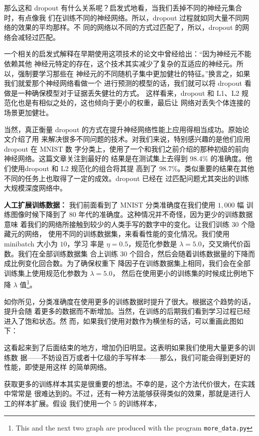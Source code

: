 那么这和 dropout 有什么关系呢？启发式地看，当我们丢掉不同的神经元集合时，有点像我
们在训练不同的神经网络。所以，dropout 过程就如同大量不同网络的效果的平均那样。不
同的网络以不同的方式过匹配了，所以，dropout 的网络会减轻过匹配。

一个相关的启发式解释在早期使用这项技术的论文中曾经给出：“因为神经元不能依赖其他
神经元特定的存在，这个技术其实减少了复杂的互适应的神经元。所以，强制要学习那些在
神经元的不同随机子集中更加健壮的特征。”换言之，如果我们就爱那个神经网络看做一个
进行预测的模型的话，我们就可以将 dropout 看做是一种确保模型对于证据丢失健壮的方式。
这样看来，dropout 和 L1、L2 规范化也是有相似之处的，这也倾向于更小的权重，最后让
网络对丢失个体连接的场景更加健壮。

当然，真正衡量 dropout 的方式在提升神经网络性能上应用得相当成功。原始论文介绍了用
来解决很多不同问题的技术。对我们来说，特别感兴趣的是他们应用 dropout 在 MNIST 数
字分类上，使用了一个和我们之前介绍的那种初级的前向神经网络。这篇文章关注到最好的
结果是在测试集上去得到 98.4\% 的准确度。他们使用dropout 和 L2 规范化的组合将其提
高到了 98.7\%。类似重要的结果在其他不同的任务上也取得了一定的成效。dropout 已经在
过匹配问题尤其突出的训练大规模深度网络中。

\textbf{人工扩展训练数据：} 我们前面看到了 MNIST 分类准确度在我们使用 $1,000$ 幅
训练图像时候下降到了 $80$ 年代的准确度。这种情况并不奇怪，因为更少的训练数据意味
着我们的网络所接触到较少的人类手写的数字中的变化。让我们训练 $30$ 个隐藏元的网络，
使用不同的训练数据集，来看看性能的变化情况。我们使用 minibatch 大小为 $10$，学习
率是 $\eta=0.5$，规范化参数是 $\lambda=5.0$，交叉熵代价函数。我们在全部训练数据集
合上训练 30 个回合，然后会随着训练数据量的下降而成比例变化回合数。为了确保权重下
降因子在训练数据集上相同，我们会在全部训练集上使用规范化参数为 $\lambda = 5.0$，
然后在使用更小的训练集的时候成比例地下降 $\lambda$ 值\footnote{This and the next
  two graph are produced with the program \lstinline!more_data.py!}。

如你所见，分类准确度在使用更多的训练数据时提升了很大。根据这个趋势的话，提升会随
着更多的数据而不断增加。当然，在训练的后期我们看到学习过程已经进入了饱和状态。然
而，如果我们使用对数作为横坐标的话，可以重画此图如下：

这看起来到了后面结束的地方，增加仍旧明显。这表明如果我们使用大量更多的训练数
据——不妨设百万或者十亿级的手写样本——那么，我们可能会得到更好的性能，即使是用这样
的简单网络。

获取更多的训练样本其实是很重要的想法。不幸的是，这个方法代价很大，在实践中常常是
很难达到的。不过，还有一种方法能够获得类似的效果，那就是进行人工的样本扩展。假设
我们使用一个 $5$ 的训练样本，

